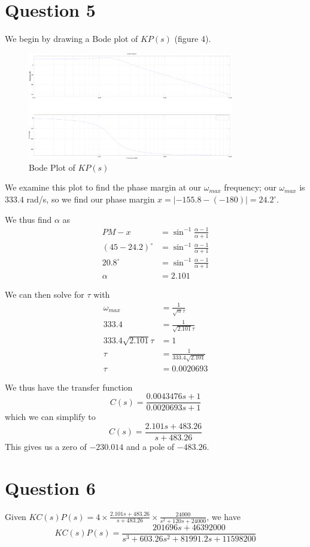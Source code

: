 \documentclass[12pt]{article}
\begin{document}
\section{Question 5}
We begin by drawing a Bode plot of $KP(s)$ (figure 4).
\begin{figure}[ht]
\centering
\includegraphics[width=0.8\textwidth]{lab5-bode.png}
\caption{Bode Plot of $KP(s)$}
\end{figure}

We examine this plot to find the phase margin at our $\omega_{max}$ frequency; our $\omega_{max}$ is $333.4$ rad/s, so we find our phase margin $x = |-155.8 - (-180)| = 24.2^\circ$.

We thus find $\alpha$ as
\begin{align*}
PM - x &= \sin^{-1} \frac{\alpha - 1}{\alpha + 1} \\
(45 - 24.2)^\circ &= \sin^{-1} \frac{\alpha - 1}{\alpha + 1} \\
20.8^\circ &= \sin^{-1} \frac{\alpha - 1}{\alpha + 1} \\
\alpha &= 2.101
\end{align*}

We can then solve for $\tau$ with
\begin{align*}
\omega_{max} &= \frac{1}{\sqrt{\alpha}\tau} \\
333.4 &= \frac{1}{\sqrt{2.101}\tau} \\
333.4\sqrt{2.101}\tau &= 1 \\
\tau &= \frac{1}{333.4\sqrt{2.101}} \\
\tau &= 0.0020693
\end{align*}

We thus have the transfer function \[ C(s) = \frac{0.0043476s + 1}{0.0020693s + 1} \] which we can simplify to \[ C(s) = \frac{2.101s + 483.26}{s + 483.26} \] This gives us a zero of $-230.014$ and a pole of $-483.26$.

\section{Question 6}
Given $KC(s)P(s) = 4 \times \frac{2.101s + 483.26}{s + 483.26} \times \frac{24000}{s^2 + 120s + 24000}$, we have \[ KC(s)P(s) = \frac{201696s + 46392000}{s^3 + 603.26s^2 + 81991.2s + 11598200} \]
\end{document}
